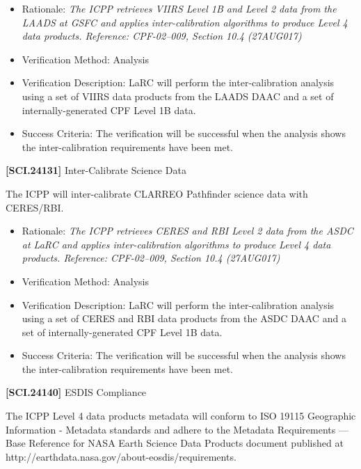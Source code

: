 \documentclass[12pt,oneside,oldfontcommands]{memoir}
\begin{document}
\begin{itemize}
\item{} Rationale: \emph{The ICPP retrieves VIIRS Level 1B and Level 2 data from the LAADS at GSFC and applies inter-calibration algorithms to produce Level 4 data products. Reference: CPF-02--009, Section 10.4 (27AUG017)}

\item{} Verification Method: Analysis

\item{} Verification Description: \gls{LaRC} will perform the inter-calibration \gls{analysis} using a set of \gls{VIIRS} data products from the \gls{LAADS} \gls{DAAC} and a set of internally-generated \gls{CPF} Level 1B data.

\item{} Success Criteria: The verification will be successful when the \gls{analysis} shows the inter-calibration requirements have been met.

\end{itemize}

\textbf{[SCI.24131]} Inter-Calibrate Science Data

The \gls{ICPP} will inter-calibrate \gls{CLARREO} Pathfinder science data with \gls{CERES}\slash \gls{RBI}.

\begin{itemize}
\item{} Rationale: \emph{The ICPP retrieves CERES and RBI Level 2 data from the ASDC at LaRC and applies inter-calibration algorithms to produce Level 4 data products. Reference: CPF-02--009, Section 10.4 (27AUG017)}

\item{} Verification Method: Analysis

\item{} Verification Description: \gls{LaRC} will perform the inter-calibration \gls{analysis} using a set of \gls{CERES} and \gls{RBI} data products from the \gls{ASDC} \gls{DAAC} and a set of internally-generated \gls{CPF} Level 1B data.

\item{} Success Criteria: The verification will be successful when the \gls{analysis} shows the inter-calibration requirements have been met.

\end{itemize}

\textbf{[SCI.24140]} \gls{ESDIS} Compliance

The \gls{ICPP} Level 4 data products metadata will conform to ISO 19115 Geographic Information - Metadata standards and adhere to the Metadata Requirements --- Base Reference for NASA Earth Science Data Products document published at http:\slash \slash earthdata.nasa.gov\slash about-eosdis\slash requirements.
\end{document}
